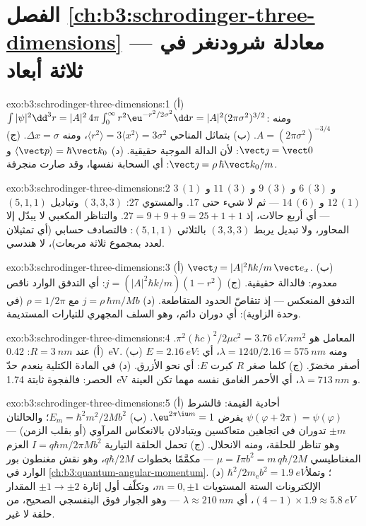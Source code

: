 \section*{الفصل \ref{ch:b3:schrodinger-three-dimensions} --- معادلة شرودنغر في ثلاثة أبعاد}

\begin{solution}{exo:b3:schrodinger-three-dimensions:1}
(أ) $\int|\psi|^2\dd^3r = |A|^2\,4\pi\int_0^\infty r^2\eu^{-r^2/2
\sigma^2}\dd r = |A|^2(2\pi\sigma^2)^{3/2}$: ومنه $A = (2\pi\sigma^2)^{
-3/4}$. (ب) بتماثل المناحي $\langle r^2\rangle = 3\langle x^2\rangle =
3\sigma^2$، ومنه $\Delta x = \sigma$. (ج) $\vect\jmath = \vect 0$: لأن
الدالة الموجية حقيقية. (د) $\langle\vect p\rangle = \hbar\vect k_0$
و $\vect\jmath = \rho\,\hbar\vect k_0/m$: أي السحابة نفسها، وقد صارت
منجرفة.
\end{solution}

\begin{solution}{exo:b3:schrodinger-three-dimensions:2}
$3\,(1)$ و $6\,(3)$ و $9\,(3)$ و $11\,(3)$ و $12\,(1)$ و $14\,(6)$ ---
ثم لا شيء حتى $17$. والمستوي $27$: $(3,3,3)$ وتباديل
$(5,1,1)$ --- أي أربع حالات، إذ $27 = 9+9+9 = 25+1+1$. والتناظر
المكعبي لا يبدّل إلا المحاور، ولا تبديل يربط $(3,3,3)$ بالثلاثي
$(5,1,1)$: فالتصادف حسابي (أي تمثيلان لعدد بمجموع ثلاثة مربعات)،
لا هندسي.
\end{solution}

\begin{solution}{exo:b3:schrodinger-three-dimensions:3}
(أ) $\vect\jmath = |A|^2\hbar k/m\,\vect e_x$. (ب) معدوم: فالدالة
حقيقية. (ج) $j = (|A|^2\hbar k/m)(1 - r^2)$: أي التدفق الوارد ناقص
التدفق المنعكس --- إذ تتقاصّ الحدود المتقاطعة. (د) $j = \rho\,\hbar
m/Mb$ مع $\rho = 1/2\pi$ (في وحدة الزاوية): أي دوران
دائم، وهو السلف المجهري للتيارات المستديمة.
\end{solution}

\begin{solution}{exo:b3:schrodinger-three-dimensions:4}
المعامل هو $\pi^2(\hbar c)^2/2\mu c^2 = \qty{3.76}{eV.nm^2}$.
(أ) عند $R = \qty{3}{nm}$: \qty{0.42}{eV}. (ب) $E = \qty{2.16}{eV}$:
ومنه $\lambda = 1240/2.16 = \qty{575}{nm}$، أي أصفر مخضرّ. (ج) كلما صغر $R$
كبرت $E$: أي نحو الأزرق. (د) في المادة الكتلية ينعدم حدّ الحصر:
فالفجوة ثابتة \qty{1.74}{eV} و $\lambda = \qty{713}{nm}$، أي
الأحمر الغامق نفسه مهما تكن العينة.
\end{solution}

\begin{solution}{exo:b3:schrodinger-three-dimensions:5}
(أ) أحادية القيمة: فالشرط $\psi(\varphi + 2\pi) = \psi(\varphi)$ يفرض
$\eu^{2\pi\iu m} = 1$. (ب) $E_m = \hbar^2m^2/2Mb^2$؛ والحالتان $\pm
m$ تدوران في اتجاهين متعاكسين ويتبادلان بالانعكاس المرآوي (أو
بقلب الزمن) --- وهو تناظر للحلقة، ومنه الانحلال. (ج)
تحمل الحلقة التيارية $I = q\hbar m/2\pi Mb^2$ العزم المغناطيسي
$\mu = I\pi b^2 = m\,q\hbar/2M$ --- مكمَّمًا بخطوات $q\hbar/2M$،
وهو نقش مغنطون بور الوارد في \cref{ch:b3:quantum-angular-momentum}.
(د) $\hbar^2/2m_{\text{e}}b^2 = \qty{1.9}{eV}$؛ وتملأ الإلكترونات الستة
المستويات $m = 0, \pm1$، وتكلّف أول إثارة $\pm1 \to \pm2$
المقدار $(4-1) \times 1.9 \approx \qty{5.8}{eV}$، أي $\lambda \approx
\qty{210}{nm}$ --- وهو الجوار فوق البنفسجي الصحيح، من حلقة
لا غير.
\end{solution}

